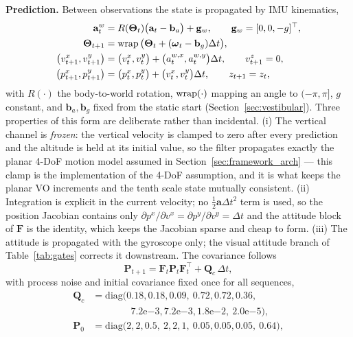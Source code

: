 \textbf{Prediction.} Between observations the state is propagated by IMU kinematics,
\begin{equation}
\begin{aligned}
    \mathbf{a}^{w}_t &= R(\boldsymbol{\Theta}_t)\big(\mathbf{a}_t-\mathbf{b}_a\big)+\mathbf{g}_w,\qquad \mathbf{g}_w=[0,0,-g]^{\top},\\
    \boldsymbol{\Theta}_{t+1} &= \operatorname{wrap}\big(\boldsymbol{\Theta}_t+(\boldsymbol{\omega}_t-\mathbf{b}_g)\Delta t\big),\\
    \big(v^{x}_{t+1},v^{y}_{t+1}\big) &= \big(v^{x}_t,v^{y}_t\big)+\big(a^{w,x}_t,a^{w,y}_t\big)\Delta t,\qquad v^{z}_{t+1}=0,\\
    \big(p^{x}_{t+1},p^{y}_{t+1}\big) &= \big(p^{x}_t,p^{y}_t\big)+\big(v^{x}_t,v^{y}_t\big)\Delta t,\qquad z_{t+1}=z_t,
\end{aligned}
    \label{eq:ekf_pred}
\end{equation}
with $R(\cdot)$ the body-to-world rotation, $\operatorname{wrap}(\cdot)$ mapping an angle to $(-\pi,\pi]$, $g$ constant, and $\mathbf{b}_a,\mathbf{b}_g$ fixed from the static start (Section~\ref{sec:vestibular}). Three properties of this form are deliberate rather than incidental. (i) The vertical channel is \emph{frozen}: the vertical velocity is clamped to zero after every prediction and the altitude is held at its initial value, so the filter propagates exactly the planar 4-DoF motion model assumed in Section~\ref{sec:framework_arch} --- this clamp is the implementation of the 4-DoF assumption, and it is what keeps the planar VO increments and the tenth scale state mutually consistent. (ii) Integration is explicit in the current velocity; no $\tfrac12\mathbf{a}\Delta t^{2}$ term is used, so the position Jacobian contains only $\partial p^{x}/\partial v^{x}=\partial p^{y}/\partial v^{y}=\Delta t$ and the attitude block of $\mathbf{F}$ is the identity, which keeps the Jacobian sparse and cheap to form. (iii) The attitude is propagated with the gyroscope only; the visual attitude branch of Table~\ref{tab:gates} corrects it downstream. The covariance follows
\begin{equation}
    \mathbf{P}_{t+1}=\mathbf{F}_t\mathbf{P}_t\mathbf{F}_t^{\top}+\mathbf{Q}_c\,\Delta t,
    \label{eq:ekf_cov}
\end{equation}
with process noise and initial covariance fixed once for all sequences,
\begin{equation}
\begin{aligned}
    \mathbf{Q}_c&=\mathrm{diag}\big(0.18,0.18,0.09,\ 0.72,0.72,0.36,\\
    &\qquad\qquad 7.2\mathrm{e}{-3},7.2\mathrm{e}{-3},1.8\mathrm{e}{-2},\ 2.0\mathrm{e}{-5}\big),\\
    \mathbf{P}_0&=\mathrm{diag}\big(2,2,0.5,\ 2,2,1,\ 0.05,0.05,0.05,\ 0.64\big),
\end{aligned}
\end{equation}
